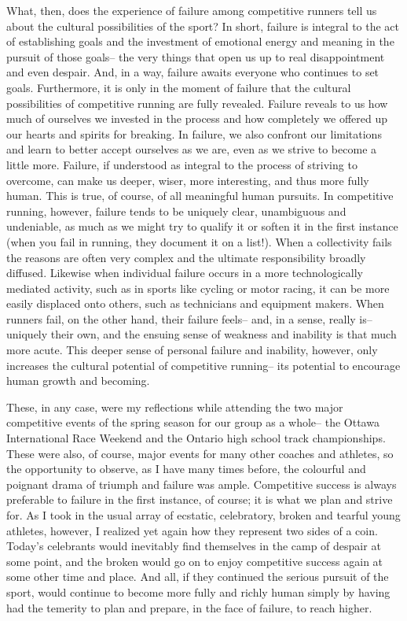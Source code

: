 What, then, does the experience of failure among competitive runners tell us about the cultural possibilities of the sport? In short, failure is integral to the act of establishing goals and the investment of emotional energy and meaning in the pursuit of those goals-- the very things that open us up to real disappointment and even despair. And, in a way, failure awaits everyone who continues to set goals. Furthermore, it is only in the moment of failure that the cultural possibilities of competitive running are fully revealed. Failure reveals to us how much of ourselves we invested in the process and how completely we offered up our hearts and spirits for breaking. In failure, we also confront our limitations and learn to better accept ourselves as we are, even as we strive to become a little more. Failure, if understood as integral to the process of striving to overcome, can make us deeper, wiser, more interesting, and thus more fully human. This is true, of course, of all meaningful human pursuits. In competitive running, however, failure tends to be uniquely clear, unambiguous and undeniable, as much as we might try to qualify it or soften it in the first instance (when you fail in running, they document it on a list!). When a collectivity fails the reasons are often very complex and the ultimate responsibility broadly diffused. Likewise when individual failure occurs in a more technologically mediated activity, such as in sports like cycling or motor racing, it can be more easily displaced onto others, such as technicians and equipment makers. When runners fail, on the other hand, their failure feels-- and, in a sense, really is-- uniquely their own, and the ensuing sense of weakness and inability is that much more acute. This deeper sense of personal failure and inability, however, only increases the cultural potential of competitive running-- its potential to encourage human growth and becoming.

These, in any case, were my reflections while attending the two major competitive events of the spring season for our group as a whole-- the Ottawa International Race Weekend and the Ontario high school track championships. These were also, of course, major events for many other coaches and athletes, so the opportunity to observe, as I have many times before, the colourful and poignant drama of triumph and failure was ample. Competitive success is always preferable to failure in the first instance, of course; it is what we plan and strive for. As I took in the usual array of ecstatic, celebratory, broken and tearful young athletes, however, I realized yet again how they represent two sides of a coin. Today's celebrants would inevitably find themselves in the camp of despair at some point, and the broken would go on to enjoy competitive success again at some other time and place. And all, if they continued the serious pursuit of the sport, would continue to become more fully and richly human simply by having had the temerity to plan and prepare, in the face of failure, to reach higher.


